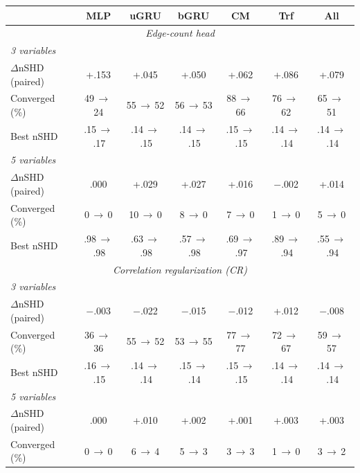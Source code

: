 \begin{table}[ht]
    \centering
    \small
    \setlength{\tabcolsep}{3pt}
    \begin{tabular}{lccccc|c}
    \toprule
        ~ & \textbf{MLP} & \textbf{uGRU} & \textbf{bGRU} & \textbf{CM} & \textbf{Trf} & \textbf{All} \\
    \midrule
        \multicolumn{7}{c}{\textit{Edge-count head}} \\
    \midrule
        \textit{3 variables} & \multicolumn{6}{c}{} \\
        \quad $\Delta$nSHD (paired) & +.153 & +.045 & +.050 & +.062 & +.086 & +.079 \\
        \quad Converged (\%) & 49\,$\to$\,24 & 55\,$\to$\,52 & 56\,$\to$\,53 & 88\,$\to$\,66 & 76\,$\to$\,62 & 65\,$\to$\,51 \\
        \quad Best nSHD & .15\,$\to$\,.17 & .14\,$\to$\,.15 & .14\,$\to$\,.15 & .15\,$\to$\,.15 & .14\,$\to$\,.14 & .14\,$\to$\,.14 \\
        \textit{5 variables} & \multicolumn{6}{c}{} \\
        \quad $\Delta$nSHD (paired) & .000 & +.029 & +.027 & +.016 & $-$.002 & +.014 \\
        \quad Converged (\%) & 0\,$\to$\,0 & 10\,$\to$\,0 & 8\,$\to$\,0 & 7\,$\to$\,0 & 1\,$\to$\,0 & 5\,$\to$\,0 \\
        \quad Best nSHD & .98\,$\to$\,.98 & .63\,$\to$\,.98 & .57\,$\to$\,.98 & .69\,$\to$\,.97 & .89\,$\to$\,.94 & .55\,$\to$\,.94 \\
    \midrule
        \multicolumn{7}{c}{\textit{Correlation regularization (CR)}} \\
    \midrule
        \textit{3 variables} & \multicolumn{6}{c}{} \\
        \quad $\Delta$nSHD (paired) & $-$.003 & $-$.022 & $-$.015 & $-$.012 & +.012 & $-$.008 \\
        \quad Converged (\%) & 36\,$\to$\,36 & 55\,$\to$\,52 & 53\,$\to$\,55 & 77\,$\to$\,77 & 72\,$\to$\,67 & 59\,$\to$\,57 \\
        \quad Best nSHD & .16\,$\to$\,.15 & .14\,$\to$\,.14 & .15\,$\to$\,.14 & .15\,$\to$\,.15 & .14\,$\to$\,.14 & .14\,$\to$\,.14 \\
        \textit{5 variables} & \multicolumn{6}{c}{} \\
        \quad $\Delta$nSHD (paired) & .000 & +.010 & +.002 & +.001 & +.003 & +.003 \\
        \quad Converged (\%) & 0\,$\to$\,0 & 6\,$\to$\,4 & 5\,$\to$\,3 & 3\,$\to$\,3 & 1\,$\to$\,0 & 3\,$\to$\,2 \\

\end{tabular}
\end{table}
